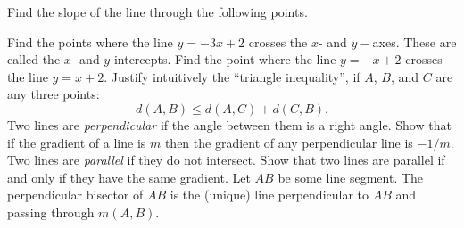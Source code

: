 \begin{questions}
  \question Find the slope of the line through the following points.
  \question Find the points where the line $ y = -3x + 2 $ crosses the $ x$- and $ y-$axes. These are called the $ x$- and $ y$-intercepts.
  \question Find the point where the line $ y = -x + 2 $ crosses the line $ y = x + 2 $.
  \question Justify intuitively the ``triangle inequality'', if $ A $, $ B $, and $ C $ are any three points:
            \begin{equation}
              d(A,B) \leq d(A,C) + d(C,B). \tag{Triangle inequality}
            \end{equation}
  \question Two lines are \emph{perpendicular} if the angle between them is a right angle. Show that if the gradient of a line is $ m $
            then the gradient of any perpendicular line is $ -1/m $.
  \question Two lines are \emph{parallel} if they do not intersect. Show that two lines are parallel if and only if they have the same gradient.
  \question Let $ AB $ be some line segment. The perpendicular bisector of $ AB $ is the (unique) line perpendicular to $ AB $ and passing
            through $ m(A,B) $.
\end{questions}
